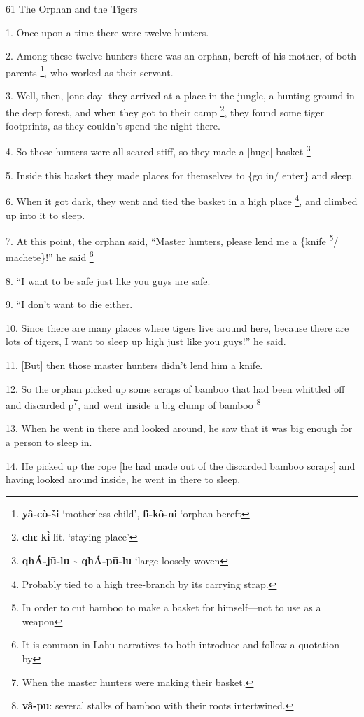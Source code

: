 
61 The Orphan and the Tigers

1. Once upon a time there were twelve hunters.

2. Among these twelve hunters there was an orphan, bereft of his mother, of both
parents \footnote{\textbf{yâ-cò-ši }`motherless child', \textbf{fɨ-kô-ni} `orphan bereft}, who worked as their servant.

3. Well, then, [one day] they arrived at a place in the jungle, a hunting ground
in the deep forest, and when they got to their camp \footnote{\textbf{chɛ kɨ̀} lit. `staying place'}, they found some tiger
footprints, as they couldn't spend the night there.

4. So those hunters were all scared stiff, so they made a [huge] basket \.\footnote{\textbf{qhÁ-jū-lu }\textasciitilde{}\textbf{ qhÁ-pū-lu} `large loosely-woven}

5. Inside this basket they made places for themselves to \{go in/ enter\} and sleep.

6. When it got dark, they went and tied the basket in a high place \footnote{Probably tied to a high tree-branch by its carrying strap.}, and climbed
up into it to sleep.

7. At this point, the orphan said, ``Master hunters, please lend me a \{knife \footnote{In order to cut bamboo to make a basket for himself---not to use as a weapon}/
machete\}!'' he said \.\footnote{It is common in Lahu narratives to both introduce and follow a quotation by}

8. ``I want to be safe just like you guys are safe.

9. ``I don't want to die either.

10. Since there are many places where tigers live around here, because there are
lots of tigers, I want to sleep up high just like you guys!'' he said.

11. [But] then those master hunters didn't lend him a knife.

12. So the orphan picked up some scraps of bamboo that had been whittled off and
discarded p\footnote{When the master hunters were making their basket.}, and went inside a big clump of bamboo \.\footnote{\textbf{vâ-pu}: several stalks of bamboo with their roots intertwined.}

13. When he went in there and looked around, he saw that it was big enough for
a person to sleep in.

14. He picked up the rope [he had made out of the discarded bamboo scraps] and
having looked around inside, he went in there to sleep.

